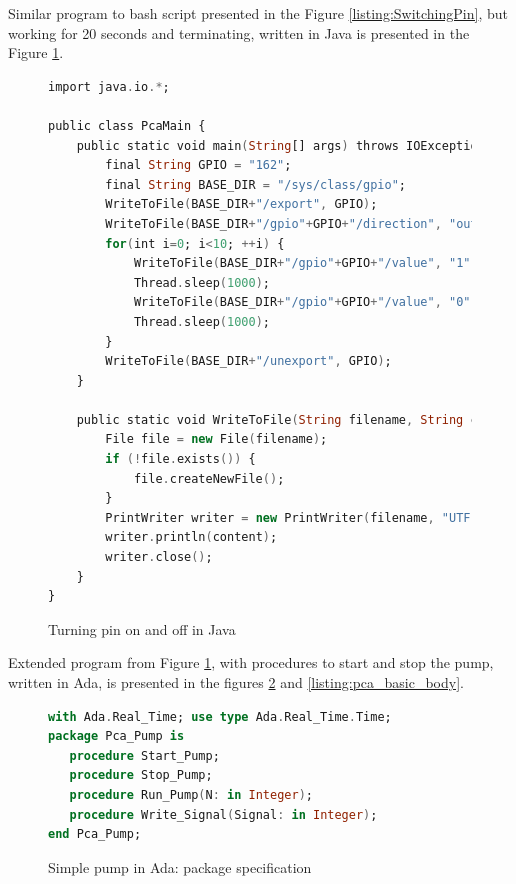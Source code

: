Similar program to bash script presented in the Figure \ref{listing:SwitchingPin}, but working for 20 seconds and terminating, written in Java is presented in the Figure \ref{listing:pca_java}. 

\begin{figure}[ht]
\singlespacing
\begin{lstlisting}[language=ada, frame=single, gobble=0]
import java.io.*;

public class PcaMain {
	public static void main(String[] args) throws IOException, InterruptedException {
		final String GPIO = "162";
		final String BASE_DIR = "/sys/class/gpio";			
		WriteToFile(BASE_DIR+"/export", GPIO);
		WriteToFile(BASE_DIR+"/gpio"+GPIO+"/direction", "out");			
		for(int i=0; i<10; ++i) {
            WriteToFile(BASE_DIR+"/gpio"+GPIO+"/value", "1");
            Thread.sleep(1000);
			WriteToFile(BASE_DIR+"/gpio"+GPIO+"/value", "0");
            Thread.sleep(1000);
		}			
		WriteToFile(BASE_DIR+"/unexport", GPIO);
	}
	
	public static void WriteToFile(String filename, String content) throws IOException {
		File file = new File(filename);			 
		if (!file.exists()) {
			file.createNewFile();
		}
		PrintWriter writer = new PrintWriter(filename, "UTF-8");
		writer.println(content);
		writer.close();
	}
}
\end{lstlisting} 
\doublespacing
\caption{Turning pin on and off in Java}
\label{listing:pca_java}
\end{figure}

Extended program from Figure \ref{listing:pca_java}, with procedures to start and stop the pump, written in Ada, is presented in the figures \ref{listing:pca_basic_spec} and \ref{listing:pca_basic_body}.

\begin{figure}[ht]
\singlespacing
\begin{lstlisting}[language=ada, frame=single, gobble=0]
with Ada.Real_Time; use type Ada.Real_Time.Time;
package Pca_Pump is   
   procedure Start_Pump;
   procedure Stop_Pump;
   procedure Run_Pump(N: in Integer);
   procedure Write_Signal(Signal: in Integer);
end Pca_Pump;
\end{lstlisting}
\doublespacing
\caption{Simple pump in Ada: package specification}
\label{listing:pca_basic_spec}
\end{figure}

